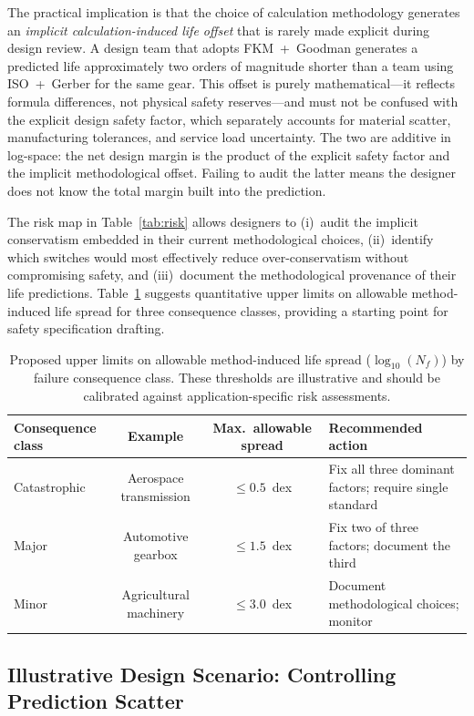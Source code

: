 \documentclass[12pt,a4paper]{article}
\begin{document}
The practical implication is that the choice of calculation methodology
generates an \emph{implicit calculation-induced life offset} that is
rarely made explicit during design review. A design team that adopts
FKM~+~Goodman generates a predicted life approximately two orders of
magnitude shorter than a team using ISO~+~Gerber for the same gear.
This offset is purely mathematical---it reflects formula differences, not
physical safety reserves---and must not be confused with the explicit
design safety factor, which separately accounts for material scatter,
manufacturing tolerances, and service load uncertainty. The two are
additive in log-space: the net design margin is the product of the
explicit safety factor and the implicit methodological offset. Failing
to audit the latter means the designer does not know the total margin
built into the prediction.

The risk map in Table~\ref{tab:risk} allows designers to (i)~audit the
implicit conservatism embedded in their current methodological choices,
(ii)~identify which switches would most effectively reduce
over-conservatism without compromising safety, and (iii)~document the
methodological provenance of their life predictions. Table~\ref{tab:risk_thresholds}
suggests quantitative upper limits on allowable method-induced
life spread for three consequence classes, providing a starting
point for safety specification drafting.

\begin{table}[h]
\centering
\caption{Proposed upper limits on allowable method-induced life spread
($\log_{10}(N_f)$) by failure consequence class. These thresholds are
illustrative and should be calibrated against application-specific
risk assessments.\label{tab:risk_thresholds}}
\begin{tabular}{lccp{5cm}}
\toprule
Consequence class & Example & Max.\ allowable spread & Recommended action \\
\midrule
Catastrophic & Aerospace transmission & $\leq 0.5$~dex & Fix all three dominant factors; require single standard \\
Major & Automotive gearbox & $\leq 1.5$~dex & Fix two of three factors; document the third \\
Minor & Agricultural machinery & $\leq 3.0$~dex & Document methodological choices; monitor \\
\bottomrule
\end{tabular}
\end{table}

\subsection{Illustrative Design Scenario: Controlling Prediction Scatter}
\end{document}
